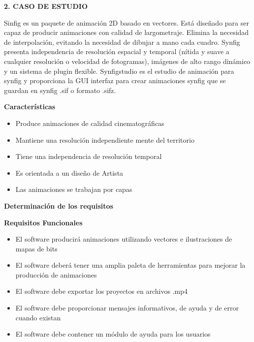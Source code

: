 \documentclass[10pt,a4paper]{article}
\begin{document}
\vspace{\baselineskip}
\vspace{\baselineskip}
\textbf{2. CASO DE ESTUDIO}
\vspace{\baselineskip}

Sinfig es un paquete de animación 2D basado en vectores. Está diseñado para ser capaz de producir animaciones con calidad de largometraje. Elimina la necesidad de interpolación, evitando la necesidad de dibujar a mano cada cuadro. Synfig presenta independencia de resolución espacial y temporal (nítida y suave a cualquier resolución o velocidad de fotogramas), imágenes de alto rango dinámico y un sistema de plugin flexible. Synfigstudio es el estudio de animación para synfig y proporciona la GUI interfaz para crear animaciones synfig que se guardan en synfig .sif o formato .sifz.
\vspace{\baselineskip}

\textbf{Características}

\begin{itemize}
\item Produce animaciones de calidad cinematográficas 
\item Mantiene una resolución independiente mente del territorio
\item Tiene una independencia de resolución temporal 
\item Es orientada a un diseño de Artista
\item Las animaciones se trabajan por capas 

\end{itemize}

\textbf{Determinación de los requisitos}
\vspace{\baselineskip}

\textbf{Requisitos Funcionales}
\vspace{\baselineskip}

\begin{itemize}
\item El software producirá animaciones utilizando vectores e ilustraciones de mapas de bits
\item El software deberá tener una amplia paleta de herramientas para mejorar la producción de animaciones
\item El software debe exportar los proyectos en archivos .mp4 
\item El software debe proporcionar mensajes informativos, de ayuda y de error cuando existan 
\item El software debe contener un módulo de ayuda para los usuarios 
\end{itemize}
\end{document}
